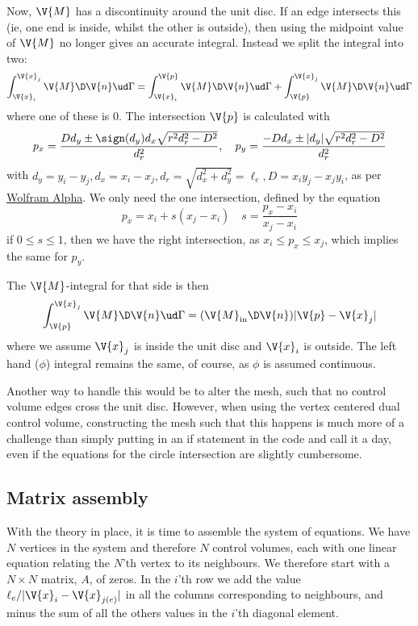 \documentclass[sigconf]{acmart}
\begin{document}
Now, $ \V{M} $ has a discontinuity around the unit disc. If an edge intersects this (ie, one end is inside, whilst the other is outside), then using the midpoint value of $ \V{M} $ no longer gives an accurate integral. Instead we split the integral into two:
\begin{equation}\label{key}
	\int_{\V{x}_i}^{\V{x}_j} \V{M}\D \V{n} \ud \Gamma = \int_{\V{x}_i}^{\V{p}} \V{M}\D \V{n} \ud \Gamma + \int_{\V{p}}^{\V{x}_j}\V{M}\D \V{n} \ud \Gamma
\end{equation}
where one of these is 0. The intersection $ \V{p} $ is calculated with
\begin{equation}\label{key}
	p_x = \frac{D d_y \pm \sign( d_y) d_x \sqrt{r^2 d_r^2 - D^2}}{d_r^2}, \quad p_y = \frac{-D d_x \pm |d_y| \sqrt{r^2 d_r^2 - D^2}}{d_r^2}
\end{equation}
with $ d_y = y_i-y_j, d_x = x_i - x_j, d_r = \sqrt{d_x^2 + d_y^2} = \ell_e , D = x_i y_j-x_jy_i$, as per \href{http://mathworld.wolfram.com/Circle-LineIntersection.html}{Wolfram Alpha}. We only need the one intersection, defined by the equation
\begin{equation}\label{key}
	p_x = x_i + s(x_j - x_i) \quad s = \frac{p_x-x_i}{x_j-x_i}
\end{equation}
if $ 0\leq s \leq 1 $, then we have the right intersection, as $ x_i \leq p_x \leq x_j $, which implies the same for $ p_y $.

The $ \V{M} $-integral for that side is then
\begin{equation}\label{key}
	\int_{\V{p}}^{\V{x}_j}\V{M}\D \V{n} \ud \Gamma = (\V{M}_{\text{in}} \D \V{n}) |\V{p}-\V{x}_j|
\end{equation}
where we assume $ \V{x}_j $ is inside the unit disc and $ \V{x}_i $ is outside. The left hand ($ \phi $) integral remains the same, of course, as $ \phi $ is assumed continuous.

Another way to handle this would be to alter the mesh, such that no control volume edges cross the unit disc. However, when using the vertex centered dual control volume, constructing the mesh such that this happens is much more of a challenge than simply putting in an if statement in the code and call it a day, even if the equations for the circle intersection are slightly cumbersome.


\subsection{Matrix assembly}
With the theory in place, it is time to assemble the system of equations. We have $ N $ vertices in the system and therefore $ N $ control volumes, each with one linear equation relating the $ N $'th vertex to its neighbours. We therefore start with a $ N\times N $ matrix, $ A $, of zeros. In the $ i $'th row we add the value $ \ell_e/|\V{x}_i-\V{x}_{j(e)}| $ in all the columns corresponding to neighbours, and minus the sum of all the others values in the $ i $'th diagonal element.
\end{document}
